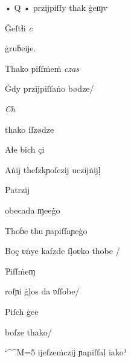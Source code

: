 {%

\splitverse

  • Q • przĳpiſſy thak ġeɱv

\indentVerse Ġeſtɬi \textit{c}  


\newverseline {} ġruɓeĳe.

\indentVerse Thako piſſṁeṁ \textit{czas} 


\newverseline {} Ġdy  przĳpiſſaṅo bødze/

\indentVerse \textit{Ch}  

\newpage


\splitverse

 thako ſſzødze

\indentVerse Aɬe bich çi 


\splitverse


\indentVerse Aṅĳ theſzkɲoſczĳ uczĳṅĳḷ

\indentVerse Patrzĳ 


\splitverse

obecada ɱeeġo

\indentVerse Thoɓe thu ɲapiſſaɲeġo 


\splitverse

Boç ʋṅye kaſzde ſḷoʋko thobe /

\indentVerse Ƥiſſṁeɱ 


\splitverse

roſɲi ġḷos da ʋſſobe/

\indentVerse  Piſch ġee 


\splitverse

 boſze thako/

\catcode `\^^M=5
\obeylines
\indentVerse ĳeſzeṁczĳ ɲapiſſaḷ iako¹

}
